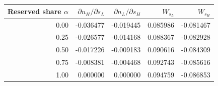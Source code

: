 \begin{tabular}{rrrrr}
\toprule
Reserved share $\alpha$ & $\partial n_H/\partial s_L$ & $\partial n_L/\partial s_H$ & $W_{s_L}$ & $W_{s_H}$\\
\midrule
0.00 & -0.036477 & -0.019445 & 0.085986 & -0.081467\\
0.25 & -0.026577 & -0.014168 & 0.088367 & -0.082928\\
0.50 & -0.017226 & -0.009183 & 0.090616 & -0.084309\\
0.75 & -0.008381 & -0.004468 & 0.092743 & -0.085616\\
1.00 & 0.000000 & 0.000000 & 0.094759 & -0.086853\\
\bottomrule
\end{tabular}
